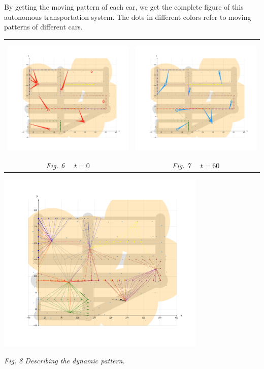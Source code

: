 \documentclass[12pt]{article}
\theoremstyle{definition}
\theoremstyle{remark}
\numberwithin{equation}{section}
\begin{document}
	\newpage
	By getting the moving pattern of each car, we get the complete figure of this autonomous transportation system. The dots in different colors refer to moving patterns of different cars.
	\begin{center}
		\begin{tabular}{cc}
		\includegraphics[height=6cm]{10.png}&	
		\includegraphics[height=6cm]{11.png}\\
		\small \textit{Fig. 6 $\quad t=0$}&
		\small \textit{Fig. 7 $\quad t=60$}\\
		\end{tabular}
		
		\includegraphics[width=10cm]{dynamic.png}
		
		\small \textit{Fig. 8 Describing the dynamic pattern.}
	\end{center}
\end{document}
